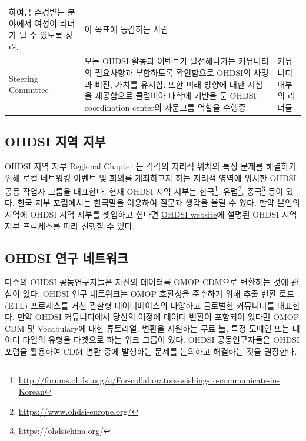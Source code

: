 \documentclass[11pt]{book}
\let\rmarkdownfootnote\footnote%
\def\footnote{\protect\rmarkdownfootnote}
\theoremstyle{definition}
\theoremstyle{definition}
\theoremstyle{definition}
\theoremstyle{remark}
\begin{document}
\begin{longtable}[]{@{}lll@{}}
\begin{minipage}[t]{0.44\columnwidth}
하여금 존경받는 분야에서 여성이 리더가 될 수 있도록 장려.\strut
\end{minipage} & \begin{minipage}[t]{0.37\columnwidth}\raggedright\strut
이 목표에 동감하는 사람\strut
\end{minipage}\tabularnewline
\begin{minipage}[t]{0.11\columnwidth}\raggedright\strut
Steering Committee\strut
\end{minipage} & \begin{minipage}[t]{0.44\columnwidth}\raggedright\strut
모든 OHDSI 활동과 이벤트가 발전해나가는 커뮤니티의 필요사항과 부합하도록
확인함으로 OHDSI의 사명과 비전, 가치를 유지함. 또한 미래 방향에 대한
지침을 제공함으로 콜럼비아 대학에 기반을 둔 OHDSI coordination center의
자문그룹 역할을 수행중.\strut
\end{minipage} & \begin{minipage}[t]{0.37\columnwidth}\raggedright\strut
커뮤니티 내부의 리더들\strut
\end{minipage}\tabularnewline
\bottomrule
\end{longtable}

\subsection{OHDSI 지역 지부}\label{ohdsi--}

OHDSI 지역 지부 Regional Chapter 는 각각의 지리적 위치의 특정 문제를
해결하기 위해 로컬 네트워킹 이벤트 및 회의를 개최하고자 하는 지리적
영역에 위치한 OHDSI 공동 작업자 그룹을 대표한다. 현재 OHDSI 지역 지부는
한국\footnote{\url{http://forums.ohdsi.org/c/For-collaborators-wishing-to-communicate-in-Korean}},
유럽\footnote{\url{https://www.ohdsi-europe.org/}}, 중국\footnote{\url{https://ohdsichina.org/}}
등이 있다. 한국 지부 포럼에서는 한국말을 이용하여 질문과 생각을 올릴 수
있다. 만약 본인의 지역에 OHDSI 지역 지부를 셋업하고 싶다면
\href{https://www.ohdsi.org/who-we-are/regional-chapters}{OHDSI
website}에 설명된 OHDSI 지역 지부 프로세스를 따라 진행할 수 있다.

\subsection{OHDSI 연구 네트워크}\label{ohdsi--}

다수의 OHDSI 공동연구자들은 자신의 데이터를 OMOP CDM으로 변환하는 것에
관심이 있다. OHDSI 연구 네트워크는 OMOP 호환성을 준수하기 위해
추출-변환-로드(ETL) 프로세스를 거친 관찰형 데이터베이스의 다양하고
글로벌한 커뮤니티를 대표한다. 만약 OHDSI 커뮤니티에서 당신의 여정에
데이터 변환이 포함되어 있다면 OMOP CDM 및 Vocabulary에 대한 튜토리얼,
변환을 지원하는 무료 툴, 특정 도메인 또는 데이터 타입의 유형을 타겟으로
하는 워크 그룹이 있다. OHDSI 공동연구자들은 OHDSI 포럼을 활용하여 CDM
변환 중에 발생하는 문제를 논의하고 해결하는 것을 권장한다.
\end{document}
